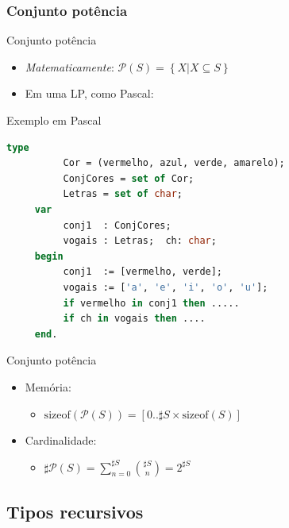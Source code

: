 \documentclass[handout]{beamer}
\begin{document}
\subsubsection{Conjunto potência}

\begin{frame}[fragile]{Conjunto potência}

   \begin{itemize}
   \item \textit{Matematicamente}: $\mathcal{P}(S) = \left\{ X | X \subseteq S \right\}$
   \item Em uma LP, como Pascal:
	\end{itemize}
\begin{block}{Exemplo em Pascal}
	\begin{lstlisting}[language=Pascal,numbers=none]
     type
          Cor = (vermelho, azul, verde, amarelo);
          ConjCores = set of Cor;
          Letras = set of char;
     var
          conj1  : ConjCores;
          vogais : Letras;  ch: char;
     begin
          conj1  := [vermelho, verde];
          vogais := ['a', 'e', 'i', 'o', 'u'];
          if vermelho in conj1 then .....
          if ch in vogais then ....
     end.
  \end{lstlisting}
\end{block}

\end{frame}


\begin{frame}{Conjunto potência}
		\begin{itemize}
			\item Memória:
				\begin{itemize}
					\item $\mathrm{sizeof}(\mathcal{P}(S)) = [0 .. \sharp S \times \mathrm{sizeof}(S)]$
				\end{itemize}

			\item Cardinalidade:
				\begin{itemize}
					\item $\sharp\mathcal{P}(S) = \sum_{n = 0}^{\sharp S} \binom{\sharp S} {n} = 2^{\sharp S}$
				\end{itemize}
		\end{itemize}
 \end{frame}



\subsection{Tipos recursivos}
\end{document}
